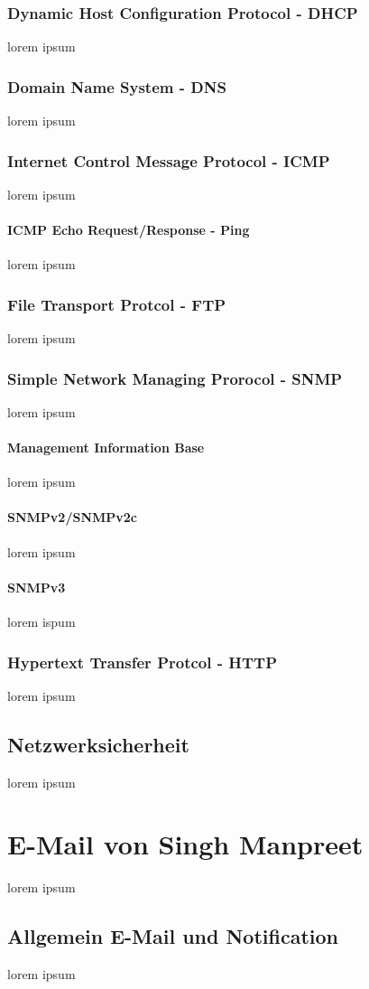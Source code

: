 \documentclass[10pt,a4paper]{report}
\begin{document}
\subsubsection{Dynamic Host Configuration Protocol - DHCP}
lorem ipsum
\subsubsection{Domain Name System - DNS}
lorem ipsum
\subsubsection{Internet Control Message Protocol - ICMP}
lorem ipsum 
\paragraph{ICMP Echo Request/Response - Ping}
lorem ipsum
\subsubsection{File Transport Protcol - FTP}
lorem ipsum
\subsubsection{Simple Network Managing Prorocol - SNMP}
lorem ipsum
\paragraph{Management Information Base}
lorem ipsum
\paragraph{SNMPv2/SNMPv2c}
lorem ipsum
\paragraph{SNMPv3}
lorem ispum
\subsubsection{Hypertext Transfer Protcol - HTTP}
lorem ipsum
\subsection{Netzwerksicherheit}
lorem ipsum
\section{E-Mail von Singh Manpreet}
lorem ipsum
\subsection{Allgemein E-Mail und Notification}
lorem ipsum
\end{document}
